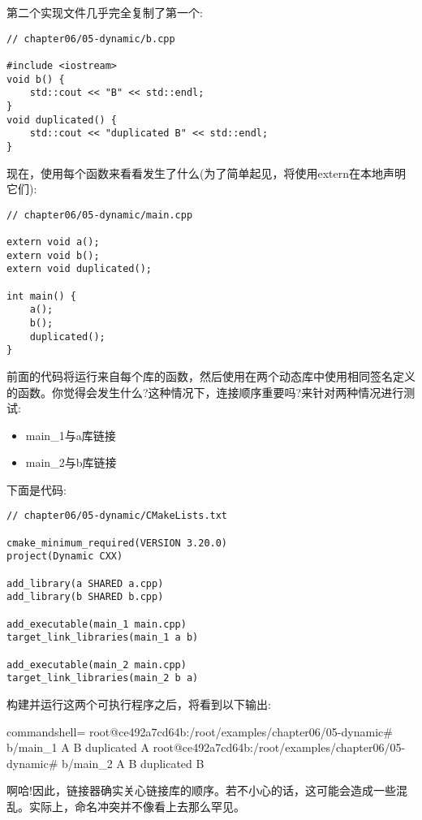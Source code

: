第二个实现文件几乎完全复制了第一个:

\begin{lstlisting}[style=styleCXX]
// chapter06/05-dynamic/b.cpp

#include <iostream>
void b() {
	std::cout << "B" << std::endl;
}
void duplicated() {
	std::cout << "duplicated B" << std::endl;
}
\end{lstlisting}

现在，使用每个函数来看看发生了什么(为了简单起见，将使用extern在本地声明它们):

\begin{lstlisting}[style=styleCXX]
// chapter06/05-dynamic/main.cpp

extern void a();
extern void b();
extern void duplicated();

int main() {
	a();
	b();
	duplicated();
}
\end{lstlisting}

前面的代码将运行来自每个库的函数，然后使用在两个动态库中使用相同签名定义的函数。你觉得会发生什么?这种情况下，连接顺序重要吗?来针对两种情况进行测试:

\begin{itemize}
\item 
main\_1与a库链接

\item 
main\_2与b库链接
\end{itemize}

下面是代码:

\begin{lstlisting}[style=styleCMake]
// chapter06/05-dynamic/CMakeLists.txt
	
cmake_minimum_required(VERSION 3.20.0)
project(Dynamic CXX)

add_library(a SHARED a.cpp)
add_library(b SHARED b.cpp)

add_executable(main_1 main.cpp)
target_link_libraries(main_1 a b)

add_executable(main_2 main.cpp)
target_link_libraries(main_2 b a)
\end{lstlisting}

构建并运行这两个可执行程序之后，将看到以下输出:

\begin{tcblisting}{commandshell={}}
root@ce492a7cd64b:/root/examples/chapter06/05-dynamic# b/main_1
A B
duplicated A
root@ce492a7cd64b:/root/examples/chapter06/05-dynamic# b/main_2
A
B
duplicated B
\end{tcblisting}

啊哈!因此，链接器确实关心链接库的顺序。若不小心的话，这可能会造成一些混乱。实际上，命名冲突并不像看上去那么罕见。

